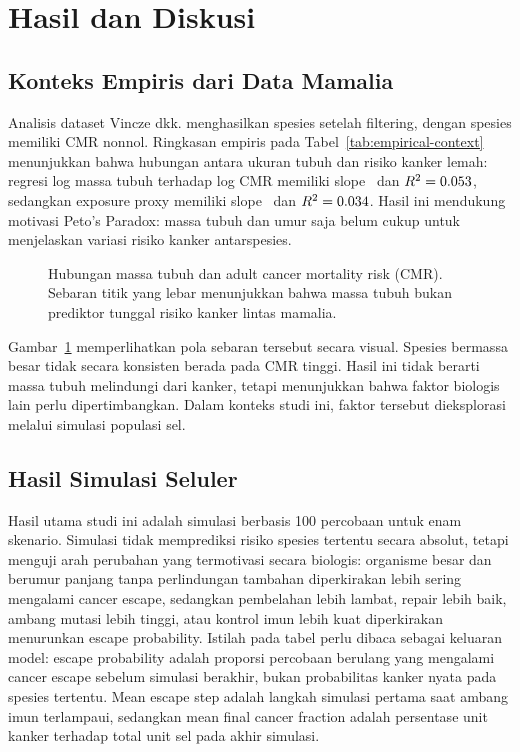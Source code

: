 \section{Hasil dan Diskusi}

\subsection{Konteks Empiris dari Data Mamalia}

Analisis dataset Vincze dkk. menghasilkan \SpeciesCount{} spesies setelah
filtering, dengan \NonzeroSpeciesCount{} spesies memiliki CMR nonnol. Ringkasan
empiris pada Tabel~\ref{tab:empirical-context} menunjukkan bahwa hubungan
antara ukuran tubuh dan risiko kanker lemah: regresi log massa tubuh terhadap
log CMR memiliki slope \MassSlope\ dan $R^2=0.053$, sedangkan exposure proxy
memiliki slope \ExposureSlope\ dan $R^2=0.034$. Hasil ini mendukung
motivasi Peto's Paradox: massa tubuh dan umur saja belum cukup untuk
menjelaskan variasi risiko kanker antarspesies.

\begin{figure}[t]
    \centering
    \resizebox{0.92\columnwidth}{!}{}
    \caption{Hubungan massa tubuh dan adult cancer mortality risk (CMR).
    Sebaran titik yang lebar menunjukkan bahwa massa tubuh bukan prediktor
    tunggal risiko kanker lintas mamalia.}
    \label{fig:mass-cmr}
\end{figure}

Gambar~\ref{fig:mass-cmr} memperlihatkan pola sebaran tersebut secara visual.
Spesies bermassa besar tidak secara konsisten berada pada CMR tinggi. Hasil ini
tidak berarti massa tubuh melindungi dari kanker, tetapi menunjukkan bahwa
faktor biologis lain perlu dipertimbangkan. Dalam konteks studi ini, faktor
tersebut dieksplorasi melalui simulasi populasi sel.

\subsection{Hasil Simulasi Seluler}

Hasil utama studi ini adalah simulasi berbasis 100 percobaan untuk enam
skenario. Simulasi tidak memprediksi risiko spesies tertentu secara absolut,
tetapi menguji arah perubahan yang termotivasi secara biologis: organisme besar
dan berumur panjang tanpa perlindungan tambahan diperkirakan lebih sering
mengalami cancer escape, sedangkan pembelahan lebih lambat, repair lebih baik,
ambang mutasi lebih tinggi, atau kontrol imun lebih kuat diperkirakan
menurunkan escape probability. Istilah pada tabel perlu dibaca sebagai keluaran
model: escape probability adalah proporsi percobaan berulang yang mengalami
cancer escape sebelum simulasi berakhir, bukan probabilitas kanker nyata pada
spesies tertentu. Mean escape step adalah langkah simulasi pertama saat ambang
imun terlampaui, sedangkan mean final cancer fraction adalah persentase unit
kanker terhadap total unit sel pada akhir simulasi.

